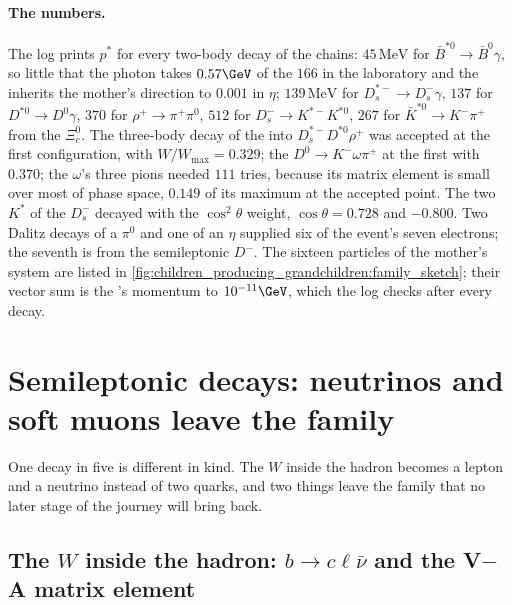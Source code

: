 \paragraph{The numbers.} The log prints $p^*$ for every two-body decay of
the chains: $45\,\mathrm{MeV}$ for $\bar B^{*0}\to\bar B^0\gamma$, so
little that the photon takes $0.57\GeV$ of the $166$ in the laboratory
and the \Bbar inherits the mother's direction to $0.001$ in $\eta$;
$139\,\mathrm{MeV}$ for $D_s^{*-}\to D_s^-\gamma$, $137$ for
$D^{*0}\to D^0\gamma$, $370$ for $\rho^+\to\pi^+\pi^0$, $512$ for
$D_s^-\to K^{*-}K^{*0}$, $267$ for $\bar K^{*0}\to K^-\pi^+$ from the
$\Xi_c^0$. The three-body decay of the \Bbar into $D_s^{*-}D^{*0}\rho^+$
was accepted at the first configuration, with $W/W_{\max}=0.329$; the
$D^0\to K^-\omega\pi^+$ at the first with $0.370$; the $\omega$'s three
pions needed $111$ tries, because its matrix element is small over most
of phase space, $0.149$ of its maximum at the accepted point. The two
$K^*$ of the $D_s^-$ decayed with the $\cos^2\theta$ weight, $\cos\theta=0.728$
and $-0.800$. Two Dalitz decays of a $\pi^0$ and one of an $\eta$ supplied
six of the event's seven electrons; the seventh is from the semileptonic
$D^-$. The sixteen particles of the mother's system are listed in
\cref{fig:children_producing_grandchildren:family_sketch}; their vector
sum is the \Bstarbar's momentum to $10^{-11}\GeV$, which the log checks
after every decay.

\section{Semileptonic decays: neutrinos and soft muons leave the family}
\label{sec:children_producing_grandchildren:semileptonic_decays_neutrinos_and_soft_m}

One decay in five is different in kind. The $W$ inside the hadron becomes
a lepton and a neutrino instead of two quarks, and two things leave the
family that no later stage of the journey will bring back.

\subsection{The \texorpdfstring{$W$}{W} inside the hadron: \texorpdfstring{$b\to c\ell\bar\nu$}{b -> c l nu} and the V\texorpdfstring{$-$}{-}A matrix element}
\label{sec:children_producing_grandchildren:va}

